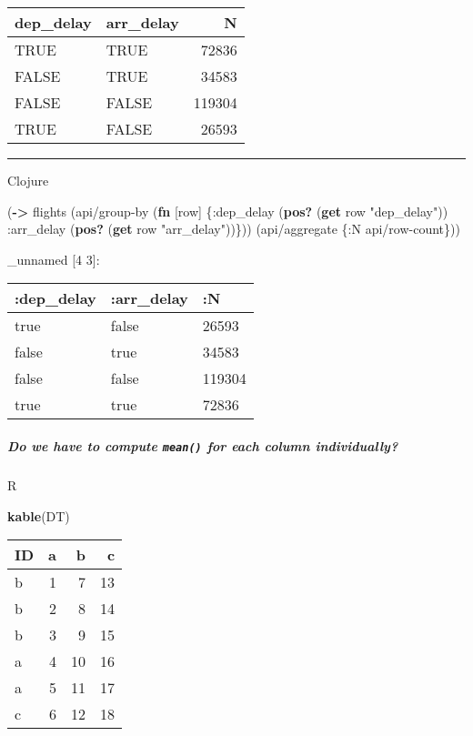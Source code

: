 \documentclass[]{article}
\newenvironment{Shaded}{\begin{snugshade}}{\end{snugshade}}
\newcommand{\AttributeTok}[1]{\textcolor[rgb]{0.77,0.63,0.00}{#1}}
\newcommand{\KeywordTok}[1]{\textcolor[rgb]{0.13,0.29,0.53}{\textbf{#1}}}
\newcommand{\NormalTok}[1]{#1}
\newcommand{\StringTok}[1]{\textcolor[rgb]{0.31,0.60,0.02}{#1}}
\let\oldsubparagraph\subparagraph
\renewcommand{\subparagraph}[1]{\oldsubparagraph{#1}\mbox{}}
\begin{document}
\begin{longtable}[]{@{}llr@{}}
\toprule
dep\_delay & arr\_delay & N\tabularnewline
\midrule
\endhead
TRUE & TRUE & 72836\tabularnewline
FALSE & TRUE & 34583\tabularnewline
FALSE & FALSE & 119304\tabularnewline
TRUE & FALSE & 26593\tabularnewline
\bottomrule
\end{longtable}

\begin{center}\rule{0.5\linewidth}{0.5pt}\end{center}

Clojure

\begin{Shaded}
\begin{Highlighting}[]
\NormalTok{(}\KeywordTok{->}\NormalTok{ flights}
\NormalTok{    (api/group-by (}\KeywordTok{fn}\NormalTok{ [row]}
\NormalTok{                    \{}\AttributeTok{:dep}\NormalTok{_delay (}\KeywordTok{pos?}\NormalTok{ (}\KeywordTok{get}\NormalTok{ row }\StringTok{"dep_delay"}\NormalTok{))}
                     \AttributeTok{:arr}\NormalTok{_delay (}\KeywordTok{pos?}\NormalTok{ (}\KeywordTok{get}\NormalTok{ row }\StringTok{"arr_delay"}\NormalTok{))\}))}
\NormalTok{    (api/aggregate \{}\AttributeTok{:N}\NormalTok{ api/row-count\}))}
\end{Highlighting}
\end{Shaded}

\_unnamed {[}4 3{]}:

\begin{longtable}[]{@{}lll@{}}
\toprule
:dep\_delay & :arr\_delay & :N\tabularnewline
\midrule
\endhead
true & false & 26593\tabularnewline
false & true & 34583\tabularnewline
false & false & 119304\tabularnewline
true & true & 72836\tabularnewline
\bottomrule
\end{longtable}

\hypertarget{do-we-have-to-compute-mean-for-each-column-individually}{%
\subparagraph{\texorpdfstring{Do we have to compute \texttt{mean()} for
each column
individually?}{Do we have to compute mean() for each column individually?}}\label{do-we-have-to-compute-mean-for-each-column-individually}}

R

\begin{Shaded}
\begin{Highlighting}[]
\KeywordTok{kable}\NormalTok{(DT)}
\end{Highlighting}
\end{Shaded}

\begin{longtable}[]{@{}lrrr@{}}
\toprule
ID & a & b & c\tabularnewline
\midrule
\endhead
b & 1 & 7 & 13\tabularnewline
b & 2 & 8 & 14\tabularnewline
b & 3 & 9 & 15\tabularnewline
a & 4 & 10 & 16\tabularnewline
a & 5 & 11 & 17\tabularnewline
c & 6 & 12 & 18\tabularnewline
\bottomrule
\end{longtable}
\end{document}
